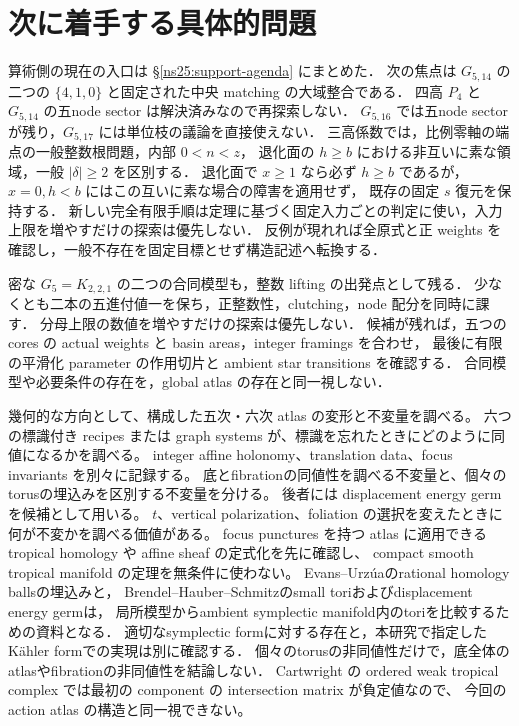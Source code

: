 \documentclass[11pt,a4paper]{article}
\begin{document}
\section{次に着手する具体的問題}

算術側の現在の入口は \S\ref{ns25:support-agenda} にまとめた．
次の焦点は $G_{5,14}$ の二つの $\{4,1,0\}$ と固定された中央 matching の大域整合である．
四高 $P_4$ と $G_{5,14}$ の五node sector は解決済みなので再探索しない．
$G_{5,16}$ では五node sector が残り，$G_{5,17}$ には単位枝の議論を直接使えない．
三高係数では，比例零軸の端点の一般整数根問題，内部 $0<n<z$，
退化面の $h\ge b$ における非互いに素な領域，一般 $|\delta|\ge2$ を区別する．
退化面で $x\ge1$ なら必ず $h\ge b$ であるが，$x=0,h<b$ にはこの互いに素な場合の障害を適用せず，
既存の固定 $s$ 復元を保持する．
新しい完全有限手順は定理に基づく固定入力ごとの判定に使い，入力上限を増やすだけの探索は優先しない．
反例が現れれば全原式と正 weights を確認し，一般不存在を固定目標とせず構造記述へ転換する．

密な $G_5=K_{2,2,1}$ の二つの合同模型も，整数 lifting の出発点として残る．
少なくとも二本の五進付値一を保ち，正整数性，clutching，node 配分を同時に課す．
分母上限の数値を増やすだけの探索は優先しない．
候補が残れば，五つの cores の actual weights と basin areas，integer framings を合わせ，
最後に有限の平滑化 parameter の作用切片と ambient star transitions を確認する．
合同模型や必要条件の存在を，global atlas の存在と同一視しない．

幾何的な方向として、構成した五次・六次 atlas の変形と不変量を調べる。
六つの標識付き recipes または graph systems が、標識を忘れたときにどのように同値になるかを調べる。
integer affine holonomy、translation data、focus invariants を別々に記録する。
底とfibrationの同値性を調べる不変量と、個々のtorusの埋込みを区別する不変量を分ける。
後者には displacement energy germ を候補として用いる。
$t$、vertical polarization、foliation の選択を変えたときに何が不変かを調べる価値がある。
focus punctures を持つ atlas に適用できる tropical homology や affine sheaf の定式化を先に確認し、
compact smooth tropical manifold の定理を無条件に使わない。
Evans--Urz\'uaのrational homology ballsの埋込み\cite{EvansUrzua}と，
Brendel--Hauber--Schmitzのsmall toriおよびdisplacement energy germ\cite{BHS}は，
局所模型からambient symplectic manifold内のtoriを比較するための資料となる．
適切なsymplectic formに対する存在と，本研究で指定したKähler formでの実現は別に確認する．
個々のtorusの非同値性だけで，底全体のatlasやfibrationの非同値性を結論しない．
Cartwright の ordered weak tropical complex では最初の component の intersection matrix が負定値なので、
今回の action atlas の構造と同一視できない。
\end{document}
